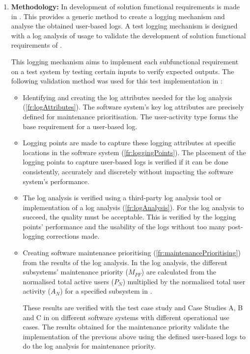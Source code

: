 \begin{enumerate}[label=\textbf{\Roman*.}]
	\item \textbf{Methodology:} In  development of solution functional requirements is made in . This provides a generic method to create a logging mechanism and analyse the obtained user-based logs. A test logging mechanism is designed with a log analysis of usage to validate the development of solution functional requirements of .\par This logging mechanism aims to implement each subfunctional requirement on a test system by testing certain inputs to verify expected outputs. The following validation method was used for this test implementation in :
		\begin{itemize}
			\item Identifying and creating the log attributes needed for the log analysis (\ref{fr:logAttributes}). The software system's key log attributes are precisely defined for maintenance prioritisation. The user-activity type forms the base requirement for a user-based log.
			
			\item Logging points are made to capture these logging attributes at specific locations in the software system (\ref{fr:loggingPoints}). The placement of the logging points to capture user-based logs is verified if it can be done consistently, accurately and discretely without impacting the software system's performance. 
			
			\item The log analysis is verified using a third-party log analysis tool or implementation of a log analysis (\ref{fr:logAnalysis}). For the log analysis to succeed, the quality must be acceptable. This is verified by the logging points' performance and the usability of the logs without too many post-logging corrections made.
			
			\item Creating software maintenance prioritising (\ref{fr:maintenancePrioritising}) from the results of the log analysis. In the log analysis, the different subsystems' maintenance priority ($M_{PF}$) are calculated from the normalised total active users ($P_N$) multiplied by the normalised total user activity ($A_N$) for a specified subsystem in .\par These results are verified with the test case study and Case Studies A, B and C in  on different software systems with different operational use cases. The results obtained for the maintenance priority validate the implementation of the previous above using the defined user-based logs to do the log analysis for maintenance priority. 
		\end{itemize}


\end{enumerate}
